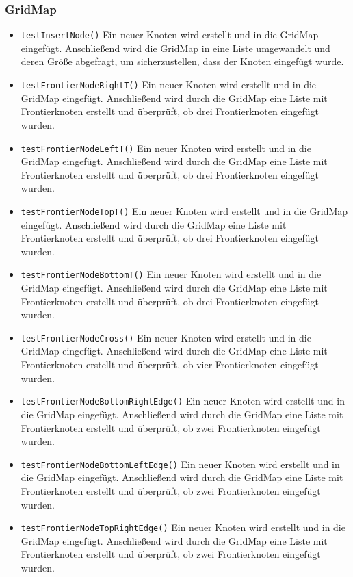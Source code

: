 \documentclass[10pt,a4paper]{article}
\begin{document}
			\subsubsection{GridMap}
			\begin{itemize}
				\item \texttt{testInsertNode()} Ein neuer Knoten wird erstellt und in die GridMap eingefügt. Anschließend wird die GridMap in eine Liste umgewandelt und deren Größe 							abgefragt, um sicherzustellen, dass der Knoten eingefügt wurde.
				\item \texttt{testFrontierNodeRightT()} Ein neuer Knoten wird erstellt und in die GridMap eingefügt. Anschließend wird durch die GridMap eine Liste mit Frontierknoten 							erstellt und überprüft, ob drei Frontierknoten eingefügt wurden.
				\item \texttt{testFrontierNodeLeftT()} Ein neuer Knoten wird erstellt und in die GridMap eingefügt. Anschließend wird durch die GridMap eine Liste mit Frontierknoten 							erstellt und überprüft, ob drei Frontierknoten eingefügt wurden.
				\item \texttt{testFrontierNodeTopT()} Ein neuer Knoten wird erstellt und in die GridMap eingefügt. Anschließend wird durch die GridMap eine Liste mit Frontierknoten 							erstellt und überprüft, ob drei Frontierknoten eingefügt wurden.
				\item \texttt{testFrontierNodeBottomT()} Ein neuer Knoten wird erstellt und in die GridMap eingefügt. Anschließend wird durch die GridMap eine Liste mit Frontierknoten 							erstellt und überprüft, ob drei Frontierknoten eingefügt wurden.
				\item \texttt{testFrontierNodeCross()} Ein neuer Knoten wird erstellt und in die GridMap eingefügt. Anschließend wird durch die GridMap eine Liste mit Frontierknoten 							erstellt und überprüft, ob vier Frontierknoten eingefügt wurden.
				\item \texttt{testFrontierNodeBottomRightEdge()} Ein neuer Knoten wird erstellt und in die GridMap eingefügt. Anschließend wird durch die GridMap eine Liste mit 								Frontierknoten erstellt und überprüft, ob zwei Frontierknoten eingefügt wurden.
				\item \texttt{testFrontierNodeBottomLeftEdge()} Ein neuer Knoten wird erstellt und in die GridMap eingefügt. Anschließend wird durch die GridMap eine Liste mit 								Frontierknoten erstellt und überprüft, ob zwei Frontierknoten eingefügt wurden.
				\item \texttt{testFrontierNodeTopRightEdge()} Ein neuer Knoten wird erstellt und in die GridMap eingefügt. Anschließend wird durch die GridMap eine Liste mit 									Frontierknoten erstellt und überprüft, ob zwei Frontierknoten eingefügt wurden.

\end{itemize}
\end{document}
